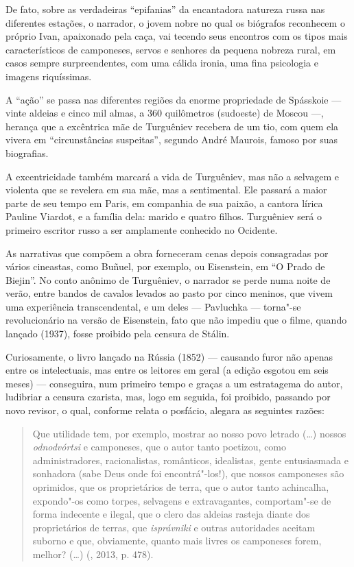 De fato, sobre as verdadeiras ``epifanias'' da encantadora natureza russa nas diferentes estações, o narrador, o jovem nobre no qual os biógrafos reconhecem o próprio Ivan, apaixonado pela caça, vai tecendo seus encontros com os tipos mais característicos de camponeses, servos e senhores da pequena nobreza rural, em casos sempre surpreendentes, com uma cálida ironia, uma fina psicologia e imagens riquíssimas.

A ``ação'' se passa nas diferentes regiões da enorme propriedade de Spásskoie --- vinte aldeias e cinco mil almas, a 360 quilômetros (sudoeste) de Moscou ---, herança que a excêntrica mãe de Turguêniev recebera de um tio, com quem ela vivera em ``circunstâncias suspeitas'', segundo André Maurois, famoso por suas biografias.

A excentricidade também marcará a vida de Turguêniev, mas não a selvagem e violenta que se revelera em sua mãe, mas a sentimental. Ele passará a maior parte de seu tempo em Paris, em companhia de sua paixão, a cantora lírica Pauline Viardot, e a família dela: marido e quatro filhos. Turguêniev será o primeiro escritor russo a ser amplamente conhecido no
Ocidente.

As narrativas que compõem a obra forneceram cenas depois consagradas por vários cineastas, como Buñuel, por exemplo, ou Eisenstein, em ``O Prado de Biejin''. No conto anônimo de Turguêniev, o narrador se perde numa noite de verão, entre bandos de cavalos levados ao pasto por cinco meninos, que vivem uma experiência transcendental, e um deles --- Pavluchka --- torna"-se revolucionário na versão de Eisenstein, fato que não impediu que o filme, quando lançado (1937), fosse proibido pela
censura de Stálin.

Curiosamente, o livro lançado na Rússia (1852) --- causando furor não apenas entre os intelectuais, mas entre os leitores em geral (a edição esgotou em seis meses) --- conseguira, num primeiro tempo e graças a um estratagema do autor, ludibriar a censura czarista, mas, logo em seguida, foi proibido, passando por novo revisor, o qual, conforme relata o posfácio, alegara as seguintes razões:

\begin{quotation}
Que utilidade tem, por exemplo, mostrar ao nosso povo letrado (\ldots{}) nossos \emph{odnodvórtsi} e camponeses, que o autor tanto poetizou, como administradores, racionalistas, românticos, idealistas, gente entusiasmada e sonhadora (sabe Deus onde foi encontrá"-los!), que nossos camponeses são oprimidos, que os proprietários de terra, que o autor tanto achincalha, expondo"-os como torpes, selvagens e extravagantes, comportam"-se de forma indecente e ilegal, que o clero das aldeias rasteja diante dos proprietários de terras, que \emph{isprávniki} e outras autoridades aceitam suborno e que, obviamente, quanto mais livres
os camponeses forem, melhor? (\ldots{}) (, 2013, p. 478).
\end{quotation}

